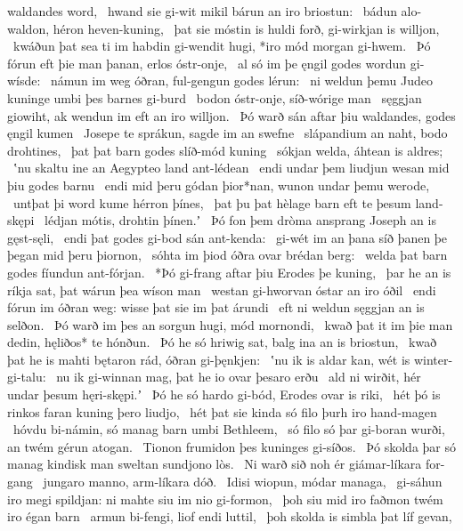 waldandes word, \hld\ hwand sie gi-wit mikil
bárun an iro briostun: \hld\ bádun alo-waldon,
héron heven-kuning, \hld\ þat sie móstin is huldi forð,
gi-wirkjan is willjon, \hld\ kwáðun þat sea ti im habdin gi-wendit hugi,
*iro mód morgan gi-hwem. \hld\ Þó fórun eft þie man þanan,
erlos óstr-onje, \hld\ al só im þe ęngil godes
wordun gi-wísde: \hld\ námun im weg óðran,
ful-gengun godes lérun: \hld\ ni weldun þemu Judeo kuninge
umbi þes barnes gi-burd \hld\ bodon óstr-onje,
síð-wórige man \hld\ sęggjan giowiht,
ak wendun im eft an iro willjon. \hld\ Þó warð sán aftar þiu waldandes,
godes ęngil kumen \hld\ Josepe te sprákun,
sagde im an swefne \hld\ slápandium an naht,
bodo drohtines, \hld\ þat þat barn godes
slíð-mód kuning \hld\ sókjan welda,
áhtean is aldres; \hld\ ʽnu skaltu ine an Aegypteo
land ant-lédean \hld\ endi undar þem liudjun wesan
mid þiu godes barnu \hld\ endi mid þeru gódan þior*nan,
wunon undar þemu werode, \hld\ untþat þi word kume
hérron þínes, \hld\ þat þu þat hèlage barn
eft te þesum land-skępi \hld\ lédjan mótis,
drohtin þínen.ʼ \hld\ Þó fon þem dròma ansprang
Joseph an is gęst-sęli, \hld\ endi þat godes gi-bod
sán ant-kenda: \hld\ gi-wét im an þana síð þanen
þe þegan mid þeru þiornon, \hld\ sóhta im þiod óðra
ovar brédan berg: \hld\ welda þat barn godes
fíundun ant-fórjan. \hld\ *Þó gi-frang aftar þiu %
Erodes þe kuning, \hld\ þar he an is ríkja sat,
þat wárun þea wíson man \hld\ westan gi-hworvan
óstar an iro óðil \hld\ endi fórun im óðran weg:
wisse þat sie im þat árundi \hld\ eft ni weldun
sęggjan an is selðon. \hld\ Þó warð im þes an sorgun hugi,
mód mornondi, \hld\ kwað þat it im þie man dedin,
hęliðos* te hónðun. \hld\ Þó he só hriwig sat,
balg ina an is briostun, \hld\ kwað þat he is mahti bętaron rád,
óðran gi-þęnkjen: \hld\ ʽnu ik is aldar kan,
wét is winter-gi-talu: \hld\ nu ik gi-winnan mag,
þat he io ovar þesaro erðu \hld\ ald ni wirðit,
hér undar þesum hęri-skępi.ʼ \hld\ Þó he só hardo gi-bód,
Erodes ovar is riki, \hld\ hét þó is rinkos faran
kuning þero liudjo, \hld\ hét þat sie kinda só filo
þurh iro hand-magen \hld\ hóvdu bi-námin,
só manag barn umbi Bethleem, \hld\ só filo só þar gi-boran wurði,
an twém gérun atogan. \hld\ Tionon frumidon
þes kuninges gi-síðos. \hld\ Þó skolda þar só manag kindisk man
sweltan sundjono lòs. \hld\ Ni warð sið noh ér
giámar-líkara for-gang \hld\ jungaro manno,
arm-líkara dóð. \hld\ Idisi wiopun,
módar managa, \hld\ gi-sáhun iro megi spildjan:
ni mahte siu im nio gi-formon, \hld\ þoh siu mid iro faðmon twém
iro égan barn \hld\ armun bi-fengi,
liof endi luttil, \hld\ þoh skolda is simbla þat líf gevan,
